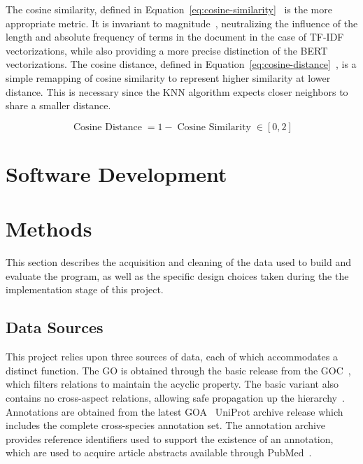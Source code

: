 \documentclass[11pt]{article}
\theoremstyle{plain}
\theoremstyle{definition}
\begin{document}
The cosine similarity, defined in Equation~\ref{eq:cosine-similarity}~\cite{you/2025/semantics} is the more appropriate metric. It is invariant to magnitude~\cite{you/2025/semantics}, neutralizing the influence of the length and absolute frequency of terms in the document in the case of TF-IDF vectorizations, while also providing a more precise distinction of the BERT vectorizations. The cosine distance, defined in Equation~\ref{eq:cosine-distance}~\cite{you/2025/semantics}, is a simple remapping of cosine similarity to represent higher similarity at lower distance. This is necessary since the KNN algorithm expects closer neighbors to share a smaller distance.

\begin{equation}\label{eq:cosine-distance}
    \operatorname{Cosine\ Distance} = 1 -  \operatorname{Cosine\ Similarity} \in [0, 2]
\end{equation}

\section{Software Development}\label{sec:development}

\section{Methods}\label{sec:methods}

This section describes the acquisition and cleaning of the data used to build and evaluate the program, as well as the specific design choices taken during the the implementation stage of this project.

\subsection{Data Sources}\label{sec:methods-source}

This project relies upon three sources of data, each of which accommodates a distinct function. The GO is obtained through the basic release from the GOC~\cite{consortium/2025/gene},  which filters relations to maintain the acyclic property. The basic variant also contains no cross-aspect relations, allowing safe propagation up the hierarchy~\cite{go/2026/download}. Annotations are obtained from the latest GOA~\cite{huntley/2014/database, barrell/2009/database} UniProt archive release which includes the complete cross-species annotation set. The annotation archive provides reference identifiers used to support the existence of an annotation, which are used to acquire article abstracts available through PubMed~\cite{sayers/2024/database}.
\end{document}
